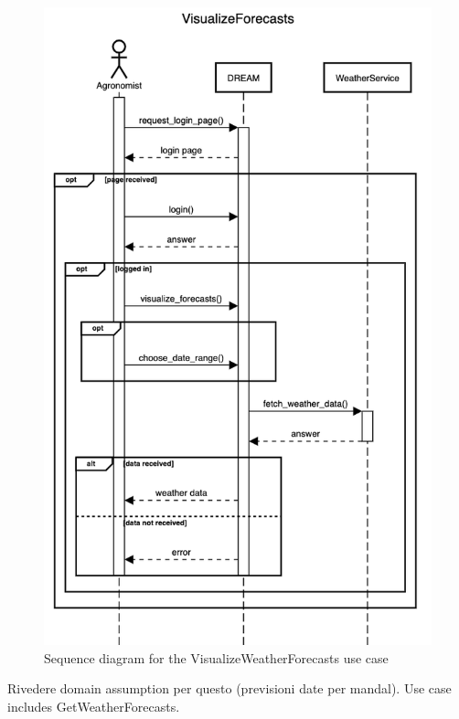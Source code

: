 \documentclass{article}
\begin{document}
\begin{figure}[H]
    \centering
	\includegraphics[scale=0.5]{sequence_diagrams/VisualizeForecasts}
    \caption{Sequence diagram for the VisualizeWeatherForecasts use case}
\end{figure}

\color{red}
Rivedere domain assumption per questo (previsioni date per mandal).
Use case includes GetWeatherForecasts.
\color{black}
\end{document}
